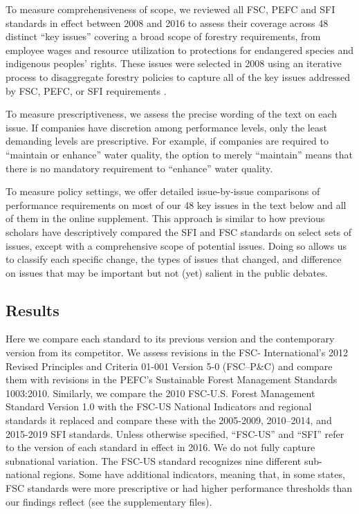 \documentclass[
      12pt,
            Review ]{article}
\begin{document}
To measure comprehensiveness of scope, we reviewed all FSC, PEFC and SFI standards in effect between 2008 and 2016 to assess their coverage across 48 distinct ``key issues'' covering a broad scope of forestry requirements, from employee wages and resource utilization to protections for endangered species and indigenous peoples' rights. These issues were selected in 2008 using an iterative process to disaggregate forestry policies to capture all of the key issues addressed by FSC, PEFC, or SFI requirements \citep{McDermott2010}.

To measure prescriptiveness, we assess the precise wording of the text on each issue. If companies have discretion among performance levels, only the least demanding levels are prescriptive. For example, if companies are required to ``maintain or enhance'' water quality, the option to merely ``maintain'' means that there is no mandatory requirement to ``enhance'' water quality.

To measure policy settings, we offer detailed issue-by-issue comparisons of performance requirements on most of our 48 key issues in the text below and all of them in the online supplement. This approach is similar to how previous scholars have descriptively compared the SFI and FSC standards on select sets of issues, except with a comprehensive scope of potential issues. Doing so allows us to classify each specific change, the types of issues that changed, and difference on issues that may be important but not (yet) salient in the public debates.

\hypertarget{results}{%
\subsection{Results}\label{results}}

Here we compare each standard to its previous version and the contemporary version from its competitor. We assess revisions in the FSC- International's 2012 Revised Principles and Criteria 01-001 Version 5-0 (FSC--P\&C) and compare them with revisions in the PEFC's Sustainable Forest Management Standards 1003:2010. Similarly, we compare the 2010 FSC-U.S. Forest Management Standard Version 1.0 with the FSC-US National Indicators and regional standards it replaced and compare these with the 2005-2009, 2010--2014, and 2015-2019 SFI standards. Unless otherwise specified, ``FSC-US'' and ``SFI'' refer to the version of each standard in effect in 2016. We do not fully capture subnational variation. The FSC-US standard recognizes nine different sub-national regions. Some have additional indicators, meaning that, in some states, FSC standards were more prescriptive or had higher performance thresholds than our findings reflect (see the supplementary files).
\end{document}
